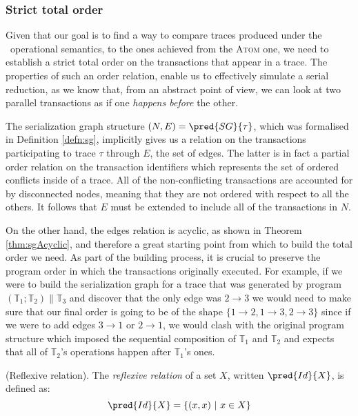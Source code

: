 \tocless\subsubsection{Strict total order}

Given that our goal is to find a way to compare traces produced under the \tpl\ operational semantics, to the ones achieved from the \textsc{Atom} one, we need to establish a strict total order on the transactions that appear in a trace. The properties of such an order relation, enable us to effectively simulate a serial reduction, as we know that, from an abstract point of view, we can look at two parallel transactions as if one \textit{happens before} the other.

The serialization graph structure $(N, E) = \pred{SG}{\tau}$, which was formalised in Definition \ref{defn:sg}, implicitly gives us a relation on the transactions participating to trace $\tau$ through $E$, the set of edges. The latter is in fact a partial order relation on the transaction identifiers which represents the set of ordered conflicts inside of a trace. All of the non-conflicting transactions are accounted for by disconnected nodes, meaning that they are not ordered with respect to all the others. It follows that $E$ must be extended to include all of the transactions in $N$.

On the other hand, the edges relation is acyclic, as shown in Theorem \ref{thm:sgAcyclic}, and therefore a great starting point from which to build the total order we need. As part of the building process, it is crucial to preserve the program order in which the transactions originally executed. For example, if we were to build the serialization graph for a trace that was generated by program $\left( \mathds{T}_1 ; \mathds{T}_2 \right) \| \mathds{T}_3$ and discover that the only edge was $2 \rightarrow 3$ we would need to make sure that our final order is going to be of the shape $\{ 1 \rightarrow 2, 1 \rightarrow 3, 2 \rightarrow 3 \}$ since if we were to add edges $3 \rightarrow 1$ or $2 \rightarrow 1$, we would clash with the original program structure which imposed the sequential composition of $\mathds{T}_1$ and $\mathds{T}_2$ and expects that all of $\mathds{T}_2$'s operations happen after $\mathds{T}_1$'s ones.

\begin{defn}
	(Reflexive relation).
	The \emph{reflexive relation} of a set $X$, written $\pred{Id}{X}$, is defined as:
	\[
		\pred{Id}{X} = \{ (x, x)\ |\ x \in X \}
	\]
\end{defn}

